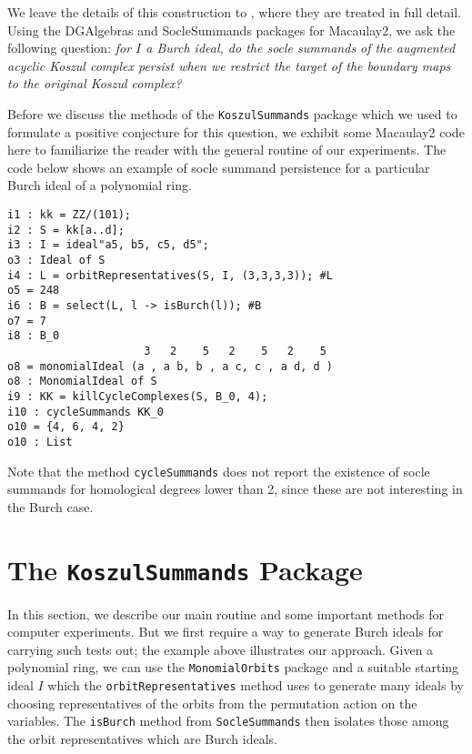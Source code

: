\documentclass[twoside,12pt, leqno]{amsart}
\begin{document}
We leave the details of this construction to \cite{GL69}, where they are treated in full detail. Using the DGAlgebras and SocleSummands packages for Macaulay2, we ask the following question: \textit{for $I$ a Burch ideal, do the socle summands of the augmented acyclic Koszul complex persist when we restrict the target of the boundary maps to the original Koszul complex?} 

\begin{example}
Before we discuss the methods of the \texttt{KoszulSummands} package which we used to formulate a positive conjecture for this question, we exhibit some Macaulay2 code here to familiarize the reader with the general routine of our experiments. The code below shows an example of socle summand persistence for a particular Burch ideal of a polynomial ring.
\end{example}
\begin{footnotesize}
\begin{verbatim}
i1 : kk = ZZ/(101);
i2 : S = kk[a..d];
i3 : I = ideal"a5, b5, c5, d5";
o3 : Ideal of S
i4 : L = orbitRepresentatives(S, I, (3,3,3,3)); #L
o5 = 248
i6 : B = select(L, l -> isBurch(l)); #B
o7 = 7
i8 : B_0
                     3   2    5   2    5   2    5
o8 = monomialIdeal (a , a b, b , a c, c , a d, d )
o8 : MonomialIdeal of S
i9 : KK = killCycleComplexes(S, B_0, 4);
i10 : cycleSummands KK_0
o10 = {4, 6, 4, 2}
o10 : List
\end{verbatim}
\end{footnotesize}

Note that the method \texttt{cycleSummands} does not report the existence of socle summands for homological degrees lower than 2, since these are not interesting in the Burch case.

\section{The \texttt{KoszulSummands} Package}

In this section, we describe our main routine and some important methods for computer experiments. But we first require a way to generate Burch ideals for carrying such tests out; the example above illustrates our approach. Given a polynomial ring, we can use the \texttt{MonomialOrbits} package and a suitable starting ideal $I$ which the \texttt{orbitRepresentatives} method uses to generate many ideals by choosing representatives of the orbits from the permutation action on the variables. The \texttt{isBurch} method from \texttt{SocleSummands} then isolates those among the orbit representatives which are Burch ideals.
\end{document}
